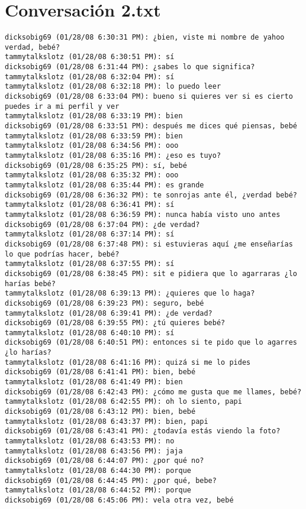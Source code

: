 \section{Conversaci\'on 2.txt}

\begin{verbatim}
dicksobig69 (01/28/08 6:30:31 PM): ¿bien, viste mi nombre de yahoo verdad, bebé?
tammytalkslotz (01/28/08 6:30:51 PM): sí
dicksobig69 (01/28/08 6:31:44 PM): ¿sabes lo que significa?
tammytalkslotz (01/28/08 6:32:04 PM): sí
tammytalkslotz (01/28/08 6:32:18 PM): lo puedo leer
dicksobig69 (01/28/08 6:33:04 PM): bueno si quieres ver si es cierto puedes ir a mi perfil y ver
tammytalkslotz (01/28/08 6:33:19 PM): bien
dicksobig69 (01/28/08 6:33:51 PM): después me dices qué piensas, bebé
tammytalkslotz (01/28/08 6:33:59 PM): bien
tammytalkslotz (01/28/08 6:34:56 PM): ooo
tammytalkslotz (01/28/08 6:35:16 PM): ¿eso es tuyo?
dicksobig69 (01/28/08 6:35:25 PM): sí, bebé
tammytalkslotz (01/28/08 6:35:32 PM): ooo
tammytalkslotz (01/28/08 6:35:44 PM): es grande
dicksobig69 (01/28/08 6:36:32 PM): te sonrojas ante él, ¿verdad bebé?
tammytalkslotz (01/28/08 6:36:41 PM): sí
tammytalkslotz (01/28/08 6:36:59 PM): nunca había visto uno antes
dicksobig69 (01/28/08 6:37:04 PM): ¿de verdad?
tammytalkslotz (01/28/08 6:37:14 PM): sí
dicksobig69 (01/28/08 6:37:48 PM): si estuvieras aquí ¿me enseñarías lo que podrías hacer, bebé?
tammytalkslotz (01/28/08 6:37:55 PM): sí
dicksobig69 (01/28/08 6:38:45 PM): sit e pidiera que lo agarraras ¿lo harías bebé?
tammytalkslotz (01/28/08 6:39:13 PM): ¿quieres que lo haga?
dicksobig69 (01/28/08 6:39:23 PM): seguro, bebé
tammytalkslotz (01/28/08 6:39:41 PM): ¿de verdad?
dicksobig69 (01/28/08 6:39:55 PM): ¿tú quieres bebé?
tammytalkslotz (01/28/08 6:40:10 PM): sí
dicksobig69 (01/28/08 6:40:51 PM): entonces si te pido que lo agarres ¿lo harías?
tammytalkslotz (01/28/08 6:41:16 PM): quizá si me lo pides
dicksobig69 (01/28/08 6:41:41 PM): bien, bebé
tammytalkslotz (01/28/08 6:41:49 PM): bien
dicksobig69 (01/28/08 6:42:43 PM): ¿cómo me gusta que me llames, bebé?
tammytalkslotz (01/28/08 6:42:55 PM): oh lo siento, papi
dicksobig69 (01/28/08 6:43:12 PM): bien, bebé
tammytalkslotz (01/28/08 6:43:37 PM): bien, papi
dicksobig69 (01/28/08 6:43:41 PM): ¿todavía estás viendo la foto?
tammytalkslotz (01/28/08 6:43:53 PM): no
tammytalkslotz (01/28/08 6:43:56 PM): jaja
dicksobig69 (01/28/08 6:44:07 PM): ¿por qué no?
tammytalkslotz (01/28/08 6:44:30 PM): porque
dicksobig69 (01/28/08 6:44:45 PM): ¿por qué, bebe?
tammytalkslotz (01/28/08 6:44:52 PM): porque
dicksobig69 (01/28/08 6:45:06 PM): vela otra vez, bebé

\end{verbatim}
